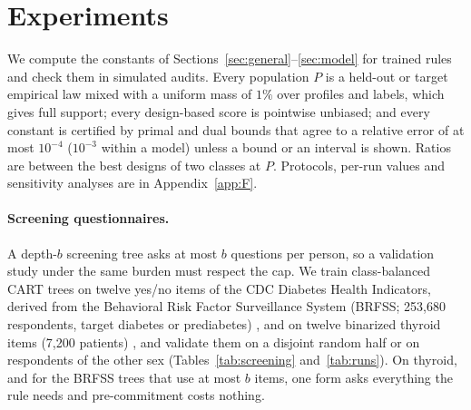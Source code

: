 \section{Experiments}\label{sec:experiments}
We compute the constants of Sections~\ref{sec:general}--\ref{sec:model} for trained rules and check them in simulated audits. Every population $P$ is a held-out or target empirical law mixed with a uniform mass of $1\%$ over profiles and labels, which gives full support; every design-based score is pointwise unbiased; and every constant is certified by primal and dual bounds that agree to a relative error of at most $10^{-4}$ ($10^{-3}$ within a model) unless a bound or an interval is shown. Ratios are between the best designs of two classes at $P$. Protocols, per-run values and sensitivity analyses are in Appendix~\ref{app:F}.



\paragraph{Screening questionnaires.}
A depth-$b$ screening tree asks at most $b$ questions per person, so a validation study under the same burden must respect the cap. We train class-balanced CART trees on twelve yes/no items of the CDC Diabetes Health Indicators, derived from the Behavioral Risk Factor Surveillance System (BRFSS; 253,680 respondents, target diabetes or prediabetes) \citep{cdcdiabetes2017}, and on twelve binarized thyroid items (7,200 patients) \citep{quinlan1986thyroid}, and validate them on a disjoint random half or on respondents of the other sex (Tables~\ref{tab:screening} and~\ref{tab:runs}). On thyroid, and for the BRFSS trees that use at most $b$ items, one form asks everything the rule needs and pre-commitment costs nothing.

